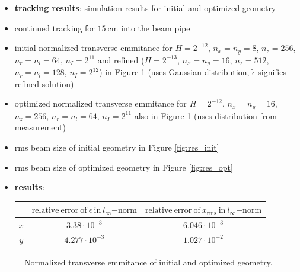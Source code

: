 \begin{itemize}
   \item \textbf{tracking results}: simulation results for initial and optimized geometry
   \item continued tracking for $15\ \mathrm{cm}$ into the beam pipe
   \item initial normalized transverse emmitance for $H=2^{-12}$, $n_x=n_y=8$, $n_z=256$, $n_r=n_l=64$, $n_I=2^{11}$ and refined ($H=2^{-13}$, $n_x=n_y=16$, $n_z=512$, $n_r=n_l=128$, $n_I=2^{12}$) in Figure \ref{fig:res_eps} (uses Gaussian distribution, $\tilde{\epsilon}$ signifies refined solution)
   \item optimized normalized transverse emmitance for $H=2^{-12}$, $n_x=n_y=16$, $n_z=256$, $n_r=n_l=64$, $n_I=2^{11}$ also in Figure \ref{fig:res_eps} (uses distribution from measurement)
   \item rms beam size of initial geometry in Figure \ref{fig:res_init}
   \item rms beam size of optimized geometry in Figure \ref{fig:res_opt}
   \item \textbf{results}: \qquad
                           \begin{tabular}{c|c|c}
                              & $\mathrm{relative\ error\ of}\ \epsilon\ \mathrm{in}\ l_\infty \mathrm{-norm}$ & $\mathrm{relative\ error\ of}\ x_\mathrm{rms}\ \mathrm{in}\ l_\infty \mathrm{-norm}$ \\
                              \hline
                              $x$ & $3.38 \cdot 10^{-3}$ & $6.046 \cdot 10^{-3}$ \\
                              $y$ & $4.277 \cdot 10^{-3}$ & $1.027 \cdot 10^{-2}$ \\
                            \end{tabular}
\end{itemize}

\begin{center}
\begin{figure}[H]
   \begin{subfigure}{0.4\textwidth}
      
   \end{subfigure}
   \qquad \qquad \qquad
   \begin{subfigure}{0.4\textwidth}
      
   \end{subfigure}
   \caption{Normalized transverse emmitance of initial and optimized geometry.}
   \label{fig:res_eps}
\end{figure}
\end{center}

